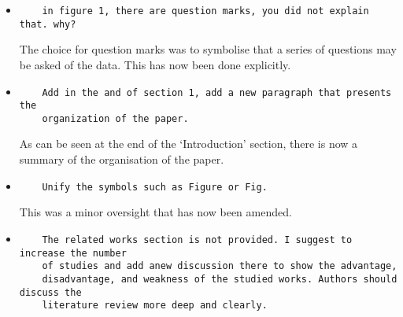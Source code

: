 \documentclass[11pt]{article}
\begin{document}
\begin{itemize}

\item
\begin{verbatim}
    in figure 1, there are question marks, you did not explain that. why?
\end{verbatim}

The choice for question marks was to symbolise that a series of questions may be
asked of the data. This has now been done explicitly.


\item
\begin{verbatim}
    Add in the and of section 1, add a new paragraph that presents the
    organization of the paper.
\end{verbatim}

As can be seen at the end of the `Introduction' section, there is now a summary
of the organisation of the paper.


\item
\begin{verbatim}
    Unify the symbols such as Figure or Fig.
\end{verbatim}

This was a minor oversight that has now been amended.

\item
\begin{verbatim}
    The related works section is not provided. I suggest to increase the number
    of studies and add anew discussion there to show the advantage,
    disadvantage, and weakness of the studied works. Authors should discuss the
    literature review more deep and clearly.
\end{verbatim}



\end{itemize}
\end{document}
